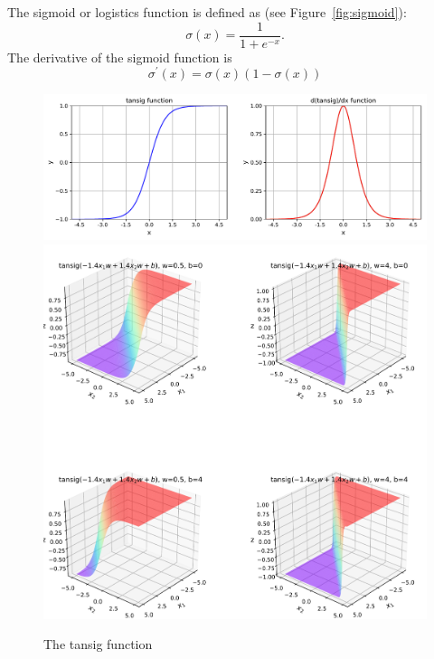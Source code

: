 The sigmoid or logistics function is defined as (see Figure~\ref{fig:sigmoid}):
\begin{equation}
\sigma(x)
=\frac{1}{1+e^{-x}}.
\end{equation}  
The derivative of the sigmoid function is 
\begin{equation}
 \sigma^\prime(x)
 =\sigma(x)(1-\sigma(x))
\end{equation}


\begin{figure}[p]
\centering
\includegraphics[width=\textwidth]{pic/tansig01}
\includegraphics[width=\textwidth]{pic/tansig02}
\caption{The tansig function \label{fig:tansig}}
\end{figure}

